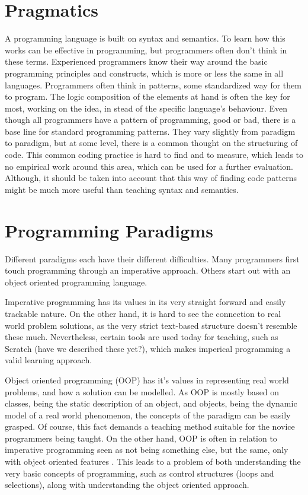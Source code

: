 \section{Pragmatics}
A programming language is built on syntax and semantics. To learn how this works can be effective in programming, but programmers often don't think in these terms. Experienced programmers know their way around the basic programming principles and constructs, which is more or less the same in all languages. Programmers often think in patterns, some standardized way for them to program. The logic composition of the elements at hand is often the key for most, working on the idea, in stead of the specific language's behaviour. Even though all programmers have a pattern of programming, good or bad, there is a base line for standard programming patterns. They vary slightly from paradigm to paradigm, but at some level, there is a common thought on the structuring of code. This common coding practice is hard to find and to measure, which leads to no empirical work around this area, which can be used for a further evaluation. Although, it should be taken into account that this way of finding code patterns might be much more useful than teaching syntax and semantics.


\section{Programming Paradigms}
Different paradigms each have their different difficulties. Many programmers first touch programming through an imperative approach. Others start out with an object oriented programming language. 

Imperative programming has its values in its very straight forward and easily trackable nature. On the other hand, it is hard to see the connection to real world problem solutions, as the very strict text-based structure doesn't resemble these much. Nevertheless, certain tools are used today for teaching, such as Scratch (have we described these yet?), which makes imperical programming a valid learning approach.

Object oriented programming (OOP) has it's values in representing real world problems, and how a solution can be modelled. As OOP is mostly based on classes, being the static description of an object, and objects, being the dynamic model of a real world phenomenon, the concepts of the paradigm can be easily grasped. Of course, this fact demands a teaching method suitable for the novice programmers being taught. On the other hand, OOP is often in relation to imperative programming seen as not being something else, but the same, only with object oriented features \cite{Garner05}. This leads to a problem of both understanding the very basic concepts of programming, such as control structures (loops and selections), along with understanding the object oriented approach.

